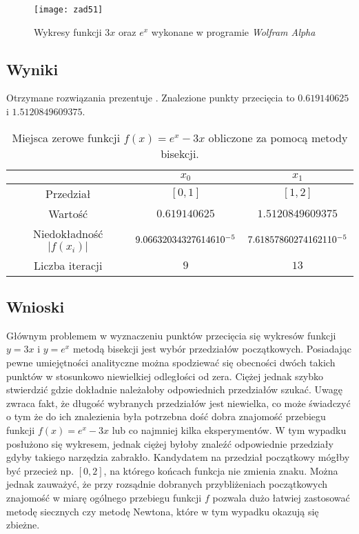 \documentclass[11pt]{mk-polish-lab-report}
\let\times\relax%
\DeclareMathOperator{\times}{\cdot}
\begin{document}
\begin{figure}[h]
\centering
\texttt{[image: zad51]}\hfill
\caption{Wykresy funkcji $3x$ oraz $e^x$ wykonane w programie \emph{Wolfram Alpha}} \label{fig:zad51}
\end{figure} 

\subsection{Wyniki}
Otrzymane rozwiązania prezentuje . Znalezione punkty przecięcia to $0.619140625$ i $1.5120849609375$.

\begin{table}[h]
        \centering
        \footnotesize
\begin{tabular}{c|c|c}
& $x_0$ & $x_1$ \\ \hline
Przedział & $[0, 1]$ & $[1, 2]$ \\ 
Wartość & $0.619140625$ & $1.5120849609375$ \\ 
Niedokładność $|f(x_i)|$ & $9.066320343276146 \times 10^{-5}$ & $7.618578602741621 \times 10^{-5}$ \\
Liczba iteracji &$9$&$13$ \\
\end{tabular}
\caption{Miejsca zerowe funkcji $f(x) = e^x - 3x$ obliczone za pomocą metody bisekcji.}
\label{table:2}
\end{table}	

\subsection{Wnioski}
Głównym problemem w wyznaczeniu punktów przecięcia się wykresów funkcji $y=3x$ i $y=e^x$ metodą bisekcji jest wybór przedziałów początkowych. Posiadając pewne umiejętności analityczne można spodziewać się obecności dwóch takich punktów w stosunkowo niewielkiej odległości od zera. Ciężej jednak szybko stwierdzić gdzie dokładnie należałoby odpowiednich przedziałów szukać. Uwagę zwraca fakt, że długość wybranych przedziałów jest niewielka, co może świadczyć o tym że do ich znalezienia była potrzebna dość dobra znajomość przebiegu funkcji $f(x) = e^x - 3x$ lub co najmniej kilka eksperymentów. W tym wypadku posłużono się wykresem, jednak ciężej byłoby znaleźć odpowiednie przedziały gdyby takiego narzędzia zabrakło. Kandydatem na przedział początkowy mógłby być przecież np. $[0, 2]$, na którego końcach funkcja nie zmienia znaku. Można jednak zauważyć, że przy rozsądnie dobranych przybliżeniach początkowych znajomość w miarę ogólnego przebiegu funkcji $f$ pozwala dużo łatwiej zastosować metodę siecznych czy metodę Newtona, które w tym wypadku okazują się zbieżne.
\end{document}

